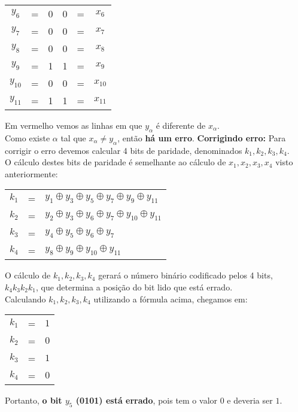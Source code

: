 \documentclass[12pt]{article}
\begin{document}
\begin{itemize}
\begin{center}
\begin{tabular}{ccc|ccc}
							$y_6$ & = & 0 & 0 & = & $x_6$\\
							$y_7$ & = & 0 & 0 & = & $x_7$\\
							$y_8$ & = & 0 & 0 & = & $x_8$\\
							$y_9$ & = & 1 & 1 & = & $x_9$\\
							$y_{10}$ & = & 0 & 0 & = & $x_{10}$\\
							$y_{11}$ & = & 1 & 1 & = & $x_{11}$\\
						\end{tabular}
					\end{center}
					Em \color{red}vermelho \color{black} vemos as linhas em que $y_\alpha$ é diferente
					de $x_\alpha$.\\
					Como existe $\alpha$ tal que $x_\alpha \neq y_\alpha$, então \textbf{há um erro}.
					\hfill\newline
					\subitem \textbf{Corrigindo erro:}
					\hfill\newline
					Para corrigir o erro devemos calcular 4 bits de paridade, denominados $k_1, k_2, k_3, k_4$.\\
					O cálculo destes bits de paridade é semelhante ao cálculo de $x_1, x_2, x_3, x_4$ visto
					anteriormente:
					\begin{center}
						\begin{tabular}{ccl}
							$k_1$ & = & $y_1 \oplus y_3 \oplus y_5 \oplus y_7 \oplus y_9 \oplus y_{11}$\\
							$k_2$ & = & $y_2 \oplus y_3 \oplus y_6 \oplus y_7 \oplus y_{10} \oplus y_{11}$\\
							$k_3$& = & $y_4 \oplus y_5 \oplus y_6 \oplus y_7$\\
							$k_4$ & = & $y_8 \oplus y_9 \oplus y_{10} \oplus y_{11}$\\
						\end{tabular}
					\end{center}
					O cálculo de $k_1, k_2, k_3, k_4$  gerará o número binário codificado pelos 4 bits,
					$k_4k_3k_2k_1$, que determina a posição do bit lido que está errado.\\
					Calculando $k_1, k_2, k_3, k_4$ utilizando a fórmula acima, chegamos em:\\
					\begin{center}
						\begin{tabular}{ccl}
							$k_1$ & = & $1$\\
							$k_2$ & = & $0$\\
							$k_3$& = & $1$\\
							$k_4$ & = & $0$\\
						\end{tabular}
					\end{center}
					Portanto, \textbf{o bit $y_5$ (0101) está errado}, pois tem o valor $0$ e 
					deveria ser $1$.
	\end{itemize}
\end{document}
